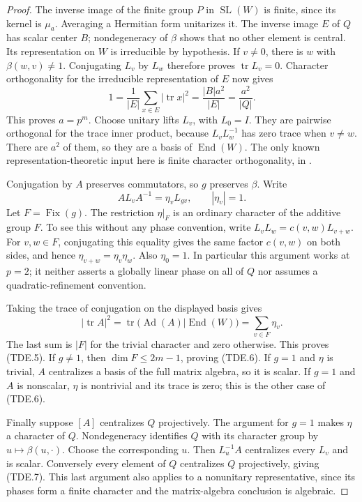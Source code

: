 \begin{proof}
The inverse image of the finite group $P$ in $\operatorname{SL}(W)$
is finite, since its kernel is $\mu_a$.  Averaging a Hermitian form
unitarizes it.  The inverse image $E$ of $Q$ has scalar center $B$;
nondegeneracy of $\beta$ shows that no other element is central.
Its representation on $W$ is irreducible by hypothesis.  If $v\ne0$,
there is $w$ with $\beta(w,v)\ne1$.  Conjugating $L_v$ by $L_w$
therefore proves $\operatorname{tr}L_v=0$.
Character orthogonality for the irreducible representation of $E$
now gives
\[
 1=\frac1{|E|}\sum_{x\in E}|\operatorname{tr}x|^2
   =\frac{|B|a^2}{|E|}=\frac{a^2}{|Q|}.
 \tag{TDE.8}
\]
This proves $a=p^m$.  Choose unitary lifts $L_v$, with $L_0=I$.
They are pairwise orthogonal for the trace inner product, because
$L_vL_w^{-1}$ has zero trace when $v\ne w$.  There are $a^2$ of
them, so they are a basis of $\operatorname{End}(W)$.
The only known representation-theoretic input here is finite character
orthogonality, in \cite[Sections2.3--2.4]{OG:Serre1977}.

Conjugation by $A$ preserves commutators, so $g$ preserves $\beta$.
Write
\[
 A L_v A^{-1}=\eta_v L_{gv},\qquad |\eta_v|=1.
 \tag{TDE.9}
\]
Let $F=\operatorname{Fix}(g)$.  The restriction $\eta|_F$ is an
ordinary character of the additive group $F$.  To see this without
any phase convention, write $L_vL_w=c(v,w)L_{v+w}$.  For $v,w\in F$,
conjugating this equality gives the same factor $c(v,w)$ on both
sides, and hence $\eta_{v+w}=\eta_v\eta_w$.  Also $\eta_0=1$.
In particular this argument works at $p=2$; it neither asserts a
globally linear phase on all of $Q$ nor assumes a quadratic-refinement
convention.

Taking the trace of conjugation on the displayed basis gives
\[
 |\operatorname{tr}A|^2
 =\operatorname{tr}\bigl(\operatorname{Ad}(A)|\operatorname{End}(W)\bigr)
 =\sum_{v\in F}\eta_v.
 \tag{TDE.10}
\]
The last sum is $|F|$ for the trivial character and zero otherwise.
This proves (TDE.5).  If $g\ne1$, then $\dim F\le2m-1$, proving
(TDE.6).  If $g=1$ and $\eta$ is trivial, $A$ centralizes a basis
of the full matrix algebra, so it is scalar.  If $g=1$ and $A$
is nonscalar, $\eta$ is nontrivial and its trace is zero; this is
the other case of (TDE.6).

Finally suppose $[A]$ centralizes $Q$ projectively.  The argument for
$g=1$ makes $\eta$ a character of $Q$.  Nondegeneracy identifies
$Q$ with its character group by $u\mapsto\beta(u,{\cdot})$.
Choose the corresponding $u$.  Then $L_u^{-1}A$ centralizes every
$L_v$ and is scalar.  Conversely every element of $Q$ centralizes
$Q$ projectively, giving (TDE.7).  This last argument also applies
to a nonunitary representative, since its phases form a finite
character and the matrix-algebra conclusion is algebraic.
\end{proof}

